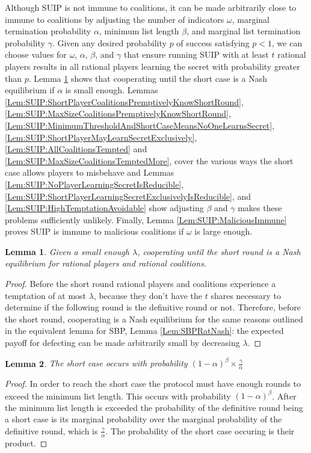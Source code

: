 \documentclass{dalcsthesis}
\newtheorem{lemma}{Lemma}
\begin{document}
Although SUIP is not immune to coalitions, it can be made arbitrarily close to immune to coalitions by adjusting the number of indicators $\omega$, marginal termination probability $\alpha$, minimum list length $\beta$, and marginal list termination probability $\gamma$. Given any desired probability $p$ of success satisfying $p < 1$, we can choose values for $\omega$, $\alpha$, $\beta$, and $\gamma$ that ensure running SUIP with at least $t$ rational players results in all rational players learning the secret with probability greater than $p$. Lemma \ref{Lem:SUIP:RatNashCoop} shows that cooperating until the short case is a Nash equilibrium if $\alpha$ is small enough. Lemmas \ref{Lem:SUIP:ShortPlayerCoalitionsPremptivelyKnowShortRound}, \ref{Lem:SUIP:MaxSizeCoalitionsPremptivelyKnowShortRound}, \ref{Lem:SUIP:MinimumThresholdAndShortCaseMeansNoOneLearnsSecret}, \ref{Lem:SUIP:ShortPlayerMayLearnSecretExclusively}, \ref{Lem:SUIP:AllCoalitionsTempted} and \ref{Lem:SUIP:MaxSizeCoalitionsTemptedMore}, cover the various ways the short case allows players to misbehave and Lemmas \ref{Lem:SUIP:NoPlayerLearningSecretIsReducible}, \ref{Lem:SUIP:ShortPlayerLearningSecretExclusivelyIsReducible}, and \ref{Lem:SUIP:HighTemptationAvoidable} show adjusting $\beta$ and $\gamma$ makes these problems sufficiently unlikely. Finally, Lemma \ref{Lem:SUIP:MaliciousImmune} proves SUIP is immune to malicious coalitions if $\omega$ is large enough.

\begin{lemma} Given a small enough $\lambda$, cooperating until the short round is a Nash equilibrium for rational players and rational coalitions. \label{Lem:SUIP:RatNashCoop} \end{lemma}
\begin{proof}
Before the short round rational players and coalitions experience a temptation of at most $\lambda$, because they don't have the $t$ shares necessary to determine if the following round is the definitive round or not. Therefore, before the short round, cooperating is a Nash equilibrium for the same reasons outlined in the equivalent lemma for SBP, Lemma \ref{Lem:SBPRatNash}: the expected payoff for defecting can be made arbitrarily small by decreasing $\lambda$.  
\end{proof}

\begin{lemma} The short case occurs with probability $(1-\alpha)^\beta \times \frac{\gamma}{\alpha}$ \label{Lem:SUIP:ChanceOfShortCase} \end{lemma}
\begin{proof}
In order to reach the short case the protocol must have enough rounds to exceed the minimum list length. This occurs with probability $(1-\alpha)^\beta$. After the minimum list length is exceeded the probability of the definitive round being a short case is its marginal probability over the marginal probability of the definitive round, which is $\frac{\gamma}{\alpha}$. The probability of the short case occuring is their product.
\end{proof}
\end{document}
